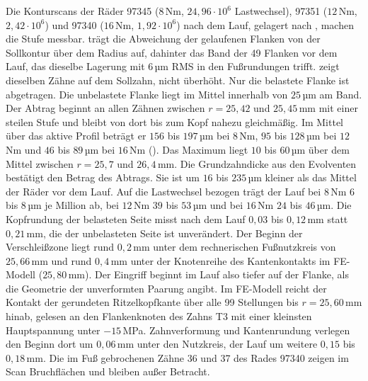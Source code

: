 Die Konturscans der Räder 97345 ($8$\,Nm, $24{,}96 \cdot 10^{6}$ Lastwechsel), 97351 ($12$\,Nm, $2{,}42 \cdot 10^{6}$) und 97340 ($16$\,Nm, $1{,}92 \cdot 10^{6}$) nach dem Lauf, gelagert nach , machen die Stufe messbar.  trägt die Abweichung der gelaufenen Flanken von der Sollkontur über dem Radius auf, dahinter das Band der 49 Flanken vor dem Lauf, das dieselbe Lagerung mit $6$\,µm RMS in den Fußrundungen trifft.  zeigt dieselben Zähne auf dem Sollzahn, nicht überhöht. Nur die belastete Flanke ist abgetragen. Die unbelastete Flanke liegt im Mittel innerhalb von $25$\,µm am Band. Der Abtrag beginnt an allen Zähnen zwischen $r = 25{,}42$ und $25{,}45$\,mm mit einer steilen Stufe und bleibt von dort bis zum Kopf nahezu gleichmäßig. Im Mittel über das aktive Profil beträgt er $156$ bis $197$\,µm bei $8$\,Nm, $95$ bis $128$\,µm bei $12$\,Nm und $46$ bis $89$\,µm bei $16$\,Nm (). Das Maximum liegt $10$ bis $60$\,µm über dem Mittel zwischen $r = 25{,}7$ und $26{,}4$\,mm. Die Grundzahndicke aus den Evolventen bestätigt den Betrag des Abtrags. Sie ist um $16$ bis $235$\,µm kleiner als das Mittel der Räder vor dem Lauf. Auf die Lastwechsel bezogen trägt der Lauf bei $8$\,Nm $6$ bis $8$\,µm je Million ab, bei $12$\,Nm $39$ bis $53$\,µm und bei $16$\,Nm $24$ bis $46$\,µm. Die Kopfrundung der belasteten Seite misst nach dem Lauf $0{,}03$ bis $0{,}12$\,mm statt $0{,}21$\,mm, die der unbelasteten Seite ist unverändert. Der Beginn der Verschleißzone liegt rund $0{,}2$\,mm unter dem rechnerischen Fußnutzkreis von $25{,}66$\,mm und rund $0{,}4$\,mm unter der Knotenreihe des Kantenkontakts im FE-Modell ($25{,}80$\,mm). Der Eingriff beginnt im Lauf also tiefer auf der Flanke, als die Geometrie der unverformten Paarung angibt. Im FE-Modell reicht der Kontakt der gerundeten Ritzelkopfkante über alle 99 Stellungen bis $r = 25{,}60$\,mm hinab, gelesen an den Flankenknoten des Zahns T3 mit einer kleinsten Hauptspannung unter $-15$\,MPa. Zahnverformung und Kantenrundung verlegen den Beginn dort um $0{,}06$\,mm unter den Nutzkreis, der Lauf um weitere $0{,}15$ bis $0{,}18$\,mm. Die im Fuß gebrochenen Zähne 36 und 37 des Rades 97340 zeigen im Scan Bruchflächen und bleiben außer Betracht.

